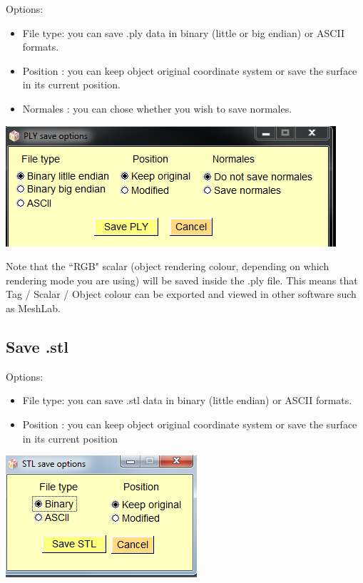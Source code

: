 \begin{minipage}{0.5\textwidth}
Options:
\begin{itemize}
\item File type: you can save .ply data in binary (little or big endian)
or ASCII formats.
\item Position : you can keep object original coordinate system or
save the surface in its current position.
\item Normales : you can chose whether you wish to save normales.
\end{itemize}

\end{minipage}    
\begin{minipage}{0.5\textwidth}\centering
  \includegraphics[scale=0.45]{images/File/Save_ply_new.png}
 \end{minipage} 

Note that the ``RGB" scalar (object rendering colour, depending on which rendering mode you
are using) will be saved inside the .ply file. This means that Tag / Scalar / Object colour can be exported and viewed in other software such as MeshLab.


\subsection{Save .stl}

\begin{minipage}{0.5\textwidth}
Options:
\begin{itemize}
\item File type: you can save .stl data in binary (little endian) or
ASCII formats.

\item Position : you can keep object original coordinate system or save the surface in its current position
\end{itemize}

\end{minipage}    
\begin{minipage}{0.5\textwidth}\centering
  \includegraphics[scale=0.5]{images/File/Save_stl.png}
 \end{minipage} 






